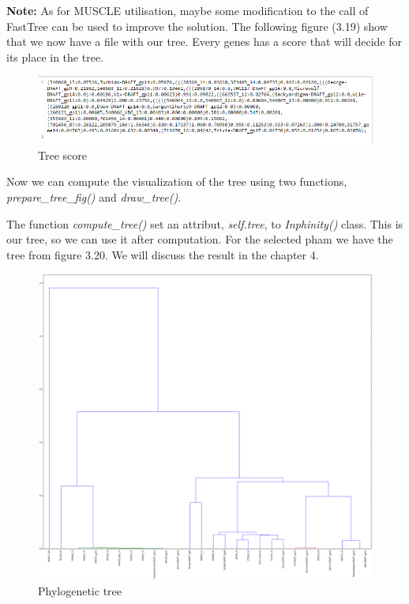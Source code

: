 \documentclass[a4paper,11pt]{report}
\begin{document}
\textbf{Note:} As for MUSCLE utilisation, maybe some modification to the call of FastTree can be used to improve the solution.
\newpage
The following figure (3.19) show that we now have a file with our tree. Every genes has a score that will decide for its place in the tree.

\begin{figure}[H] 
	\begin{center}
		\includegraphics[scale=0.6]{img/tree}
		\caption{Tree score}
	\end{center}
\end{figure}

Now we can compute the visualization of the tree using two functions, \textit{prepare\_tree\_fig()} and \textit{draw\_tree()}.

The function \textit{compute\_tree()} set an attribut, \textit{self.tree}, to \textit{Inphinity()} class. This is our tree, so we can use it after computation. For the selected pham we have the tree from figure 3.20. We will discuss the result in the chapter 4.

\begin{figure}[H] 
	\begin{center}
		\includegraphics[scale=0.28]{img/tree_fig}
		\caption{Phylogenetic tree}
	\end{center}
\end{figure}
\newpage
\end{document}
